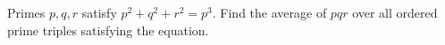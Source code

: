 Primes $p,q,r$ satisfy $p^2+q^2+r^2=p^3$. Find the average of $pqr$ over all ordered prime triples satisfying the equation.
